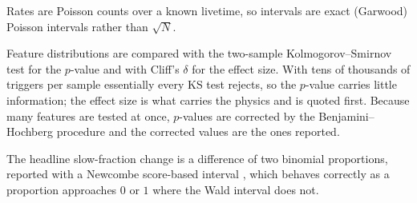 Rates are Poisson counts over a known livetime, so intervals are exact
(Garwood) Poisson intervals rather than $\sqrt{N}$.

Feature distributions are compared with the two-sample Kolmogorov--Smirnov
test for the $p$-value and with Cliff's $\delta$ \citep{Cliff1993} for the
effect size. With tens of thousands of triggers per sample essentially every
KS test rejects, so the $p$-value carries little information; the effect size
is what carries the physics and is quoted first. Because many features are
tested at once, $p$-values are corrected by the Benjamini--Hochberg procedure
\citep{BenjaminiHochberg1995} and the corrected values are the ones reported.

The headline slow-fraction change is a difference of two binomial proportions,
reported with a Newcombe score-based interval \citep{Newcombe1998}, which
behaves correctly as a proportion approaches $0$ or $1$ where the Wald
interval does not.
